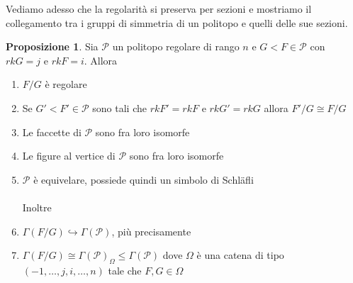 \documentclass[a4paper,12pt]{report}
\newcommand{\p}{\mathcal{P}}
\theoremstyle{plain}
\theoremstyle{definition}
\newtheorem{prop}[teo]{Proposizione}
\begin{document}
Vediamo adesso che la regolarit\`a si preserva per sezioni e mostriamo il collegamento tra i gruppi di simmetria di un politopo e quelli delle sue sezioni.

\begin{prop}
Sia $\p$ un politopo regolare di rango $n$ e $G<F\in\p$ con $rkG=j$ e $rkF=i$. Allora
\begin{enumerate}
\item $F/G$ \`e regolare
\item Se $G'<F'\in\p$ sono tali che $rkF'=rkF$ e $rkG'=rkG$ allora $F'/G\cong F/G$
\item Le faccette di $\p$ sono fra loro isomorfe
\item Le figure al vertice di $\p$ sono fra loro isomorfe
\item $\p$ 	\`e equivelare, possiede quindi un simbolo di Schl\"afli\\\\
Inoltre
\item $\Gamma(F/G)\hookrightarrow\Gamma(\p)$, pi\`u precisamente
\item $\Gamma(F/G)\cong \Gamma(\p)_\Omega\leq\Gamma(\p)$ dove $\Omega$ \`e una catena di tipo $(-1,\dots,j,i,\dots,n)$ tale che $F,G\in\Omega$
\end{enumerate}
\end{prop}
\end{document}
